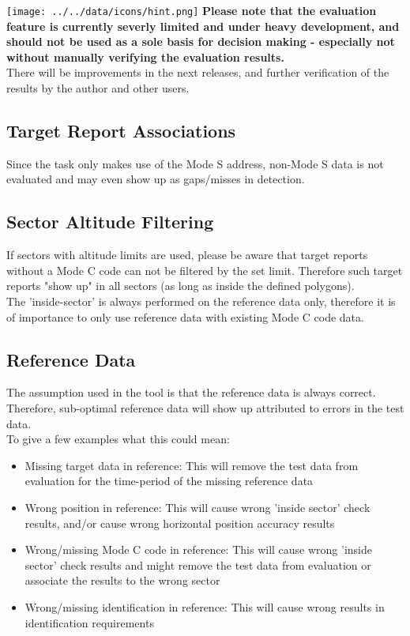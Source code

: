 \texttt{[image: ../../data/icons/hint.png]} \textbf{Please note that the evaluation feature is currently severly limited and under heavy development, and should not be used as a sole basis for decision making - especially not without manually verifying the evaluation results.} \\

There will be improvements in the next releases, and further verification of the results by the author and other users.

\subsection{Target Report Associations}

Since the task only makes use of the Mode S address, non-Mode S data is not evaluated and may even show up as gaps/misses in detection.

\subsection{Sector Altitude Filtering}

If sectors with altitude limits are used, please be aware that target reports without a Mode C code can not be filtered by the set limit. Therefore such target reports "show up" in all sectors (as long as inside the defined polygons). \\

The 'inside-sector' is always performed on the reference data only, therefore it is of importance to only use reference data with existing Mode C code data.

\subsection{Reference Data}

The assumption used in the tool is that the reference data is always correct. Therefore, sub-optimal reference data will show up attributed to errors in the test data. \\

To give a few examples what this could mean:
\begin{itemize}  
\item Missing target data in reference: This will remove the test data from evaluation for the time-period of the missing reference data
\item Wrong position in reference: This will cause wrong 'inside sector' check results, and/or cause wrong horizontal position accuracy results
\item Wrong/missing Mode C code in reference: This will cause wrong 'inside sector' check results and might remove the test data from evaluation or associate the results to the wrong sector
\item Wrong/missing identification in reference: This will cause wrong results in identification requirements
\end{itemize}
\ \\

